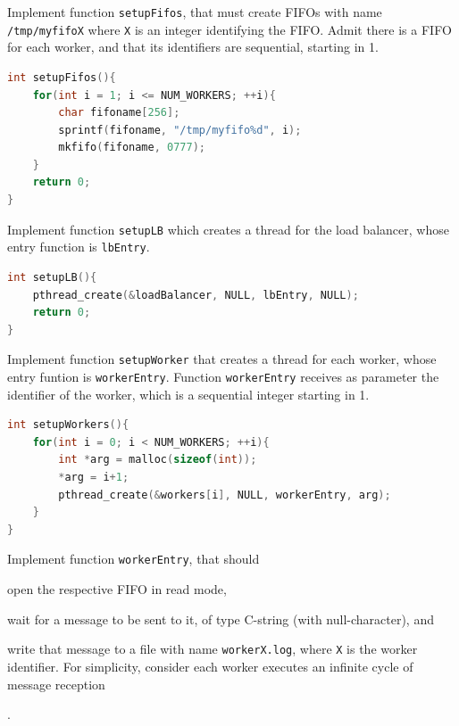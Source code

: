 \documentclass{sope}
\begin{document}
Implement function \texttt{setupFifos}, that must create FIFOs with name \texttt{/tmp/myfifoX} where \texttt{X} is an integer identifying the FIFO. Admit there is a FIFO for each worker, and that its identifiers are sequential, starting in 1.

\ansseparator

\begin{lstlisting}[language=C]
int setupFifos(){
    for(int i = 1; i <= NUM_WORKERS; ++i){
        char fifoname[256];
        sprintf(fifoname, "/tmp/myfifo%d", i);
        mkfifo(fifoname, 0777);
    }
    return 0;
}
\end{lstlisting}


Implement function \texttt{setupLB} which creates a thread for the load balancer, whose entry function is \texttt{lbEntry}.

\ansseparator

\begin{lstlisting}[language=C]
int setupLB(){
    pthread_create(&loadBalancer, NULL, lbEntry, NULL);
    return 0;
}
\end{lstlisting}


Implement function \texttt{setupWorker} that creates a thread for each worker, whose entry funtion is \texttt{workerEntry}. Function \texttt{workerEntry} receives as parameter the identifier of the worker, which is a sequential integer starting in 1.

\ansseparator

\begin{lstlisting}[language=C]
int setupWorkers(){
    for(int i = 0; i < NUM_WORKERS; ++i){
        int *arg = malloc(sizeof(int));
        *arg = i+1;
        pthread_create(&workers[i], NULL, workerEntry, arg);
    }
}
\end{lstlisting}

Implement function \texttt{workerEntry}, that should
\begin{enumerate*}[label=(\arabic*)]
    \item open the respective FIFO in read mode,
    \item wait for a message to be sent to it, of type C-string (with null-character), and
    \item write that message to a file with name \texttt{workerX.log}, where \texttt{X} is the worker identifier. For simplicity, consider each worker executes an infinite cycle of message reception
\end{enumerate*}.
\end{document}
